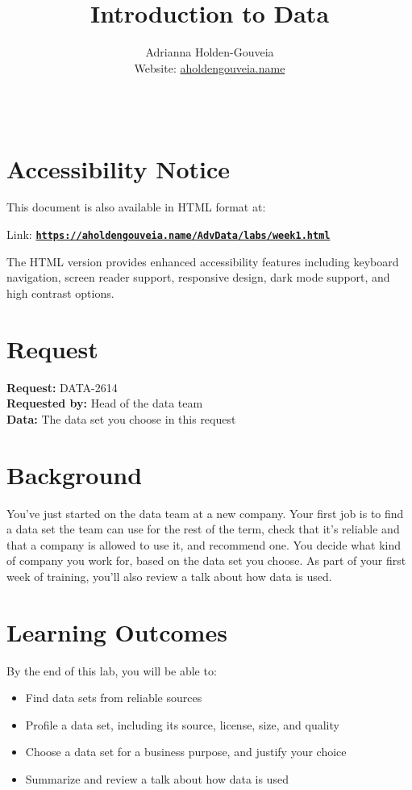 \documentclass[12pt]{article}
\title{Introduction to Data}
\author{
        Adrianna Holden-Gouveia \\
        Website: \href{https://aholdengouveia.name}{aholdengouveia.name}\\ 
        \date{\vspace{-5ex}}
        \faGithub {: aholdengouveia} \\
        }
\begin{document}
    

\maketitle



\section*{Accessibility Notice}
This document is also available in HTML format at:

Link: \href{https://aholdengouveia.name/AdvData/labs/week1.html}{\textbf{\nolinkurl{https://aholdengouveia.name/AdvData/labs/week1.html}}}

The HTML version provides enhanced accessibility features including keyboard navigation, screen reader support, responsive design, dark mode support, and high contrast options.

\section*{Request}
\noindent\textbf{Request:} DATA-2614\\
\textbf{Requested by:} Head of the data team\\
\textbf{Data:} The data set you choose in this request

\section*{Background}
You've just started on the data team at a new company. Your first job is to find a data set the team can use for the rest of the term, check that it's reliable and that a company is allowed to use it, and recommend one. You decide what kind of company you work for, based on the data set you choose. As part of your first week of training, you'll also review a talk about how data is used.

\section*{Learning Outcomes}
By the end of this lab, you will be able to:
\begin{itemize}
    \item Find data sets from reliable sources
    \item Profile a data set, including its source, license, size, and quality
    \item Choose a data set for a business purpose, and justify your choice
    \item Summarize and review a talk about how data is used
\end{itemize}
\end{document}
